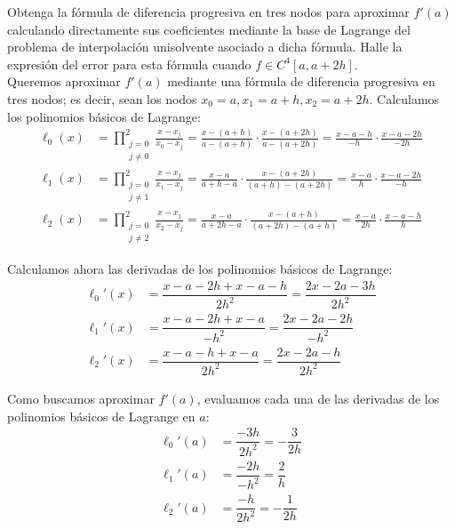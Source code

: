 \begin{ejercicio}\label{ej:2.1.3}
    Obtenga la fórmula de diferencia progresiva en tres nodos para aproximar $f'(a)$ calculando directamente sus coeficientes mediante la base de Lagrange del problema de interpolación unisolvente asociado a dicha fórmula. Halle la expresión del error para esta fórmula cuando $f \in C^4[a, a + 2h]$.\\

    Queremos aproximar $f'(a)$ mediante una fórmula de diferencia progresiva en tres nodos; es decir, sean los nodos $x_0=a, x_1=a+h, x_2=a+2h$. Calculamos los polinomios básicos de Lagrange:
    \begin{align*}
        \ell_0(x) &= \prod_{\substack{j=0\\j\neq 0}}^{2}\frac{x - x_j}{x_0 - x_j} = \frac{x - (a+h)}{a - (a+h)}\cdot\frac{x - (a+2h)}{a - (a+2h)} = \frac{x - a - h}{-h}\cdot\frac{x - a - 2h}{-2h}\\
        \ell_1(x) &= \prod_{\substack{j=0\\j\neq 1}}^{2}\frac{x - x_j}{x_1 - x_j} = \frac{x - a}{a+h - a}\cdot\frac{x - (a+2h)}{(a+h) - (a+2h)} = \frac{x - a}{h}\cdot\frac{x - a - 2h}{-h}\\
        \ell_2(x) &= \prod_{\substack{j=0\\j\neq 2}}^{2}\frac{x - x_j}{x_2 - x_j} = \frac{x - a}{a+2h - a}\cdot\frac{x - (a+h)}{(a+2h) - (a+h)} = \frac{x - a}{2h}\cdot\frac{x - a - h}{h}
    \end{align*}

    Calculamos ahora las derivadas de los polinomios básicos de Lagrange:
    \begin{align*}
        \ell_0'(x) &= \dfrac{x-a-2h + x-a-h}{2h^2} = \dfrac{2x-2a-3h}{2h^2}\\
        \ell_1'(x) &= \dfrac{x-a-2h + x-a}{-h^2} = \dfrac{2x-2a-2h}{-h^2}\\
        \ell_2'(x) &= \dfrac{x-a-h + x-a}{2h^2} = \dfrac{2x-2a-h}{2h^2}
    \end{align*}

    Como buscamos aproximar $f'(a)$, evaluamos cada una de las derivadas de los polinomios básicos de Lagrange en $a$:
    \begin{align*}
        \ell_0'(a) &= \dfrac{-3h}{2h^2} = -\dfrac{3}{2h}\\
        \ell_1'(a) &= \dfrac{-2h}{-h^2} = \dfrac{2}{h}\\
        \ell_2'(a) &= \dfrac{-h}{2h^2} = -\dfrac{1}{2h}
    \end{align*}


\end{ejercicio}
